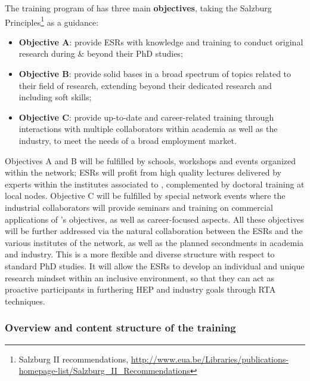 The training program of \acronym has three main {\bf objectives}, taking the Salzburg Principles\footnote{Salzburg II recommendations, \url{http://www.eua.be/Libraries/publications-homepage-list/Salzburg_II_Recommendations}} as a guidance: 
\begin{itemize}
\item {\bf Objective A}: provide ESRs with knowledge and training to conduct original research during \& beyond their PhD studies;
\item {\bf Objective B}: provide solid bases in a broad spectrum of topics related to their field of research, extending beyond their dedicated research and including soft skills; 
\item {\bf Objective C}: provide up-to-date and career-related training through interactions with multiple collaborators within academia as well as the industry, to meet the needs of a broad employment market.
\end{itemize}

Objectives A and B will be fulfilled by schools, workshops and events organized within the network; ESRs will profit from high quality lectures delivered by experts within the institutes associated to \acronym, complemented by doctoral training at local nodes. Objective C will be fulfilled by special network events where the industrial collaborators will provide seminars and training on commercial applications of \acronym's objectives, as well as career-focused aspects. All these objectives will be further addressed via the natural collaboration between the ESRs and the various institutes of the network, as well as the planned secondments in academia and industry. This is a more flexible and diverse structure with respect to standard PhD studies. It will allow the ESRs to develop an individual and unique research mindset within an inclusive environment, so that they can act as proactive participants in furthering HEP and industry goals through RTA techniques.
\vspace{-2mm}
\subsubsection{Overview and content structure of the training}
\label{sub:overviewTraining}

